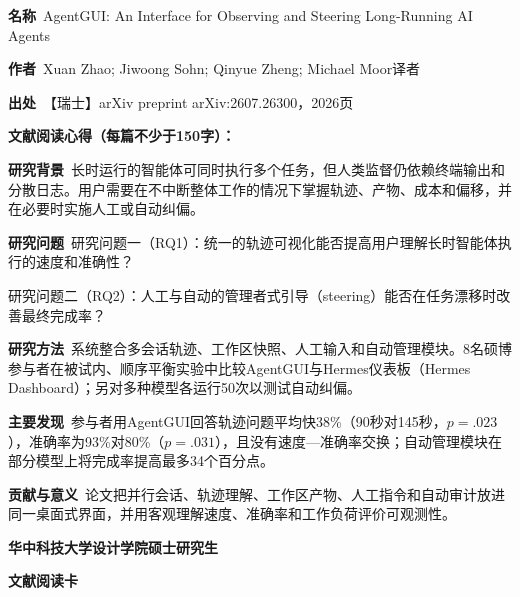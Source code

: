 \vspace{0.25em}
\noindent\underline{}\par
\vspace{0.35em}
\noindent\textbf{名称}\ AgentGUI: An Interface for Observing and Steering Long-Running AI Agents\par
\noindent\textbf{作者}\ Xuan Zhao; Jiwoong Sohn; Qinyue Zheng; Michael Moor\quad 译者\par
\noindent\textbf{出处}\ 【瑞士】arXiv preprint arXiv:2607.26300，2026\quad 页\par
\vspace{0.35em}
\noindent\textbf{文献阅读心得（每篇不少于150字）：}\par
\noindent\textbf{研究背景}\ 长时运行的智能体可同时执行多个任务，但人类监督仍依赖终端输出和分散日志。用户需要在不中断整体工作的情况下掌握轨迹、产物、成本和偏移，并在必要时实施人工或自动纠偏。\par
\noindent\textbf{研究问题}\ 研究问题一（RQ1）：统一的轨迹可视化能否提高用户理解长时智能体执行的速度和准确性？\par
研究问题二（RQ2）：人工与自动的管理者式引导（steering）能否在任务漂移时改善最终完成率？\par
\noindent\textbf{研究方法}\ 系统整合多会话轨迹、工作区快照、人工输入和自动管理模块。8名硕博参与者在被试内、顺序平衡实验中比较AgentGUI与Hermes仪表板（Hermes Dashboard）；另对多种模型各运行50次以测试自动纠偏。\par
\noindent\textbf{主要发现}\ 参与者用AgentGUI回答轨迹问题平均快38\%（90秒对145秒，$p=.023$），准确率为93\%对80\%（$p=.031$），且没有速度—准确率交换；自动管理模块在部分模型上将完成率提高最多34个百分点。\par
\noindent\textbf{贡献与意义}\ 论文把并行会话、轨迹理解、工作区产物、人工指令和自动审计放进同一桌面式界面，并用客观理解速度、准确率和工作负荷评价可观测性。\par
\clearpage
\begin{center}
{\songti\bfseries\fontsize{18.5pt}{27.75pt}\selectfont 华中科技大学设计学院硕士研究生\par}
{\songti\bfseries\fontsize{18.5pt}{27.75pt}\selectfont 文献阅读卡\par}
\end{center}
\vspace{0.25em}
\noindent\underline{}\par
\vspace{0.35em}
